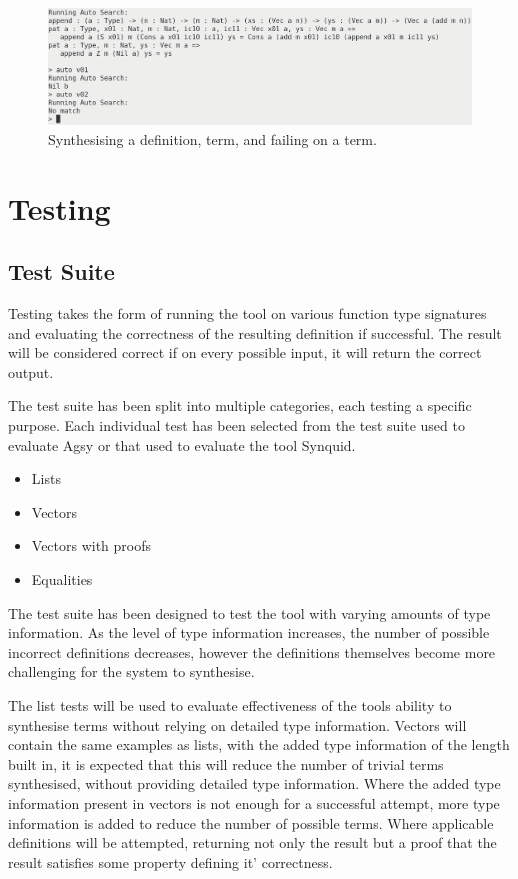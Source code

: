 \documentclass[a4paper]{article}
\begin{document}
\begin{center}
\begin{figure}[htbp]
\centering
\includegraphics[scale=0.25]{./Resource/running.png}
\caption{Synthesising a definition, term, and failing on a term.}
\end{figure}
\end{center}

\clearpage

\section{Testing}
\label{sec:orgfd7bf85}

\subsection{Test Suite}

Testing takes the form of running the tool on various
function type signatures and evaluating the correctness
of the resulting definition if successful. The result
will be considered correct if on every possible input, it
will return the correct output. 

The test suite has been split into multiple categories, 
each testing a specific purpose. Each individual test 
has been selected from the test suite used to evaluate 
Agsy or that used to evaluate the tool Synquid.


\begin{itemize}
\item Lists
\item Vectors
\item Vectors with proofs
\item Equalities
\end{itemize}

The test suite has been designed to test the tool with varying
amounts of type information. As the level of type information
increases, the number of possible incorrect definitions decreases,
however the definitions themselves become more challenging for the
system to synthesise.

The list tests will be used to evaluate effectiveness of the
tools ability to synthesise terms without relying on detailed
type information. Vectors will contain the same examples as lists,
with the added type information of the length built in, it is expected that
this will reduce the number of trivial terms synthesised, without providing
detailed type information. Where the added type information present in
vectors is not enough for a successful attempt, more type information is added
to reduce the number of possible terms. Where applicable definitions will be
attempted, returning not only the result but a proof that the result satisfies
some property defining it' correctness. 
\end{document}
